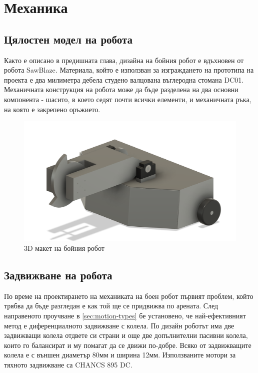 \chapter{Механика}

 
\section{Цялостен модел на робота}

Както е описано в предишната глава, дизайна на бойния робот е вдъхновен от робота SawBlaze. Материала, който е използван за изграждането на прототипа на проекта е два милиметра дебела студено валцована въглеродна стомана DC01. Механичната конструкция на робота може да бъде разделена на два основни компонента - шасито, в което седят почти всички елементи, и механичната ръка, на която е закрепено оръжието.  

\begin{figure}[H]
    \centering
    \includegraphics[width=1.1\linewidth]{images/robot-home.png}
    
    \caption{3D макет на бойния робот}
    \label{fig:robot-home} 
\end{figure}


\section{Задвижване на робота}
\label{sec:motion}

По време на проектирането на механиката на боен робот първият проблем, който трябва да бъде разгледан е как той ще се придвижва по арената. След направеното проучване в \cref{sec:motion-types} бе установено, че най-ефективният метод е диференциалното задвижване с колела. По дизайн роботът има две задвижващи колела отдвете си страни и още две допълнителни пасивни колела, които го балансират и му помагат да се движи по-добре. Всяко от задвижващите колела е с външен диаметър 80мм и ширина 12мм. Използваните мотори за тяхното задвижване са CHANCS 895 DC.

